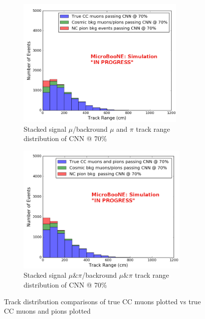 \begin{figure}[htp!]
\centering
	\begin{subfigure}[b]{.45\textwidth}
	\includegraphics[width=\textwidth,height=2.5in]{figs/sel1mod_cnn_trackrange_mupi_acc70_0707.png}
	\caption{Stacked signal $\mu$/backround $\mu$ and $\pi$ track range distribution of CNN @ 70\%}
	\end{subfigure}
	\quad
	\begin{subfigure}[b]{.45\textwidth}
	\includegraphics[width=\textwidth,height=2.5in]{figs/sel1mod_mupi_trackrange_acc70.png}
	\caption{Stacked signal $\mu \& \pi$/backround $\mu \& \pi$ track range distribution of CNN @ 70\%}
	\end{subfigure}
	\quad
\caption{Track distribution comparisons of true CC muons plotted vs true CC muons and pions plotted}
\label{fig:mupi}
\end{figure}


